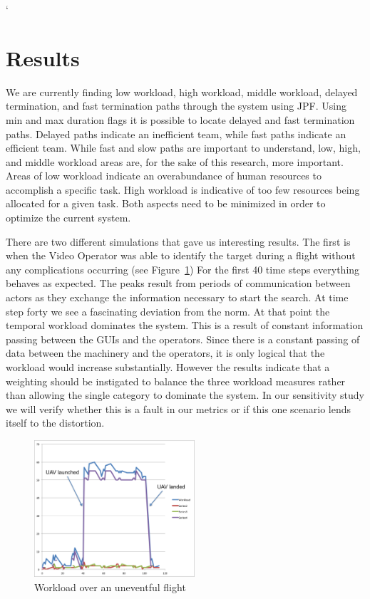 `\section{Results}
We are currently finding low workload, high workload, middle workload, delayed termination, and fast termination paths through the system using JPF. Using min and max duration flags it is possible to locate delayed and fast termination paths. Delayed paths indicate an inefficient team, while fast paths indicate an efficient team. While fast and slow paths are important to understand, low, high, and middle workload areas are, for the sake of this research, more important. Areas of low workload indicate an overabundance of human resources to accomplish a specific task. High workload is indicative of too few resources being allocated for a given task. Both aspects need to be minimized in order to optimize the current system. 

There are two different simulations that gave us interesting results. The first is when the Video Operator was able to identify the target during a flight without any complications occurring (see Figure~\ref{fig:WorkloadSim1}) For the first 40 time steps everything behaves as expected. The peaks result from periods of communication between actors as they exchange the information necessary to start the search. At time step forty we see a fascinating deviation from the norm. At that point the temporal workload dominates the system. This is a result of constant information passing between the GUIs and the operators. Since there is a constant passing of data between the machinery and the operators, it is only logical that the workload would increase substantially. However the results indicate that a weighting should be instigated to balance the three workload measures rather than allowing the single category to dominate the system. In our sensitivity study we will verify whether this is a fault in our metrics or if this one scenario lends itself to the distortion.

\begin{figure}[h]
\center
\setlength{\abovecaptionskip}{1mm}
\setlength{\belowcaptionskip}{1mm}
\setlength{\textfloatsep}{1mm}
\setlength{\floatsep}{1mm}
\includegraphics[height=2in]{WorkloadTargetSightingLabeled.png}
\caption{Workload over an uneventful flight}
\label{fig:WorkloadSim1}
\end{figure}

